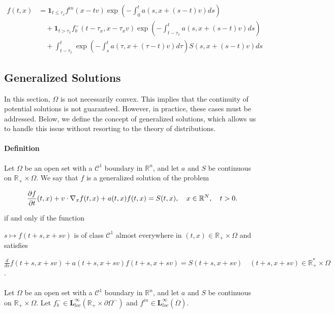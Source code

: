 \documentclass[a4paper, 11pt]{article}
\begin{document}
\[
\boxed{
	\begin{aligned}
		f(t,x) &= \mathbf{1}_{t \leq \tau_x} f^{in} (x-tv) \exp\left(-\int_0^t a(s,x+(s-t)v)ds\right) \\
		&\quad + \mathbf{1}_{t > \tau_x} f_b^- (t-\tau_x,x-\tau_x v) \exp\left(-\int_{t-\tau_x}^t a(s,x+(s-t)v)ds\right) \\
		&\quad + \int_{t-\tau_x}^t \exp\left(-\int_{s}^{t}a(\tau,x+(\tau-t)v)d\tau\right) S(s,x+(s-t)v)ds
\end{aligned}}
\]


\subsection{Generalized Solutions}

In this section, $\Omega$ is not necessarily convex. This implies that the continuity of potential solutions is not guaranteed. However, in practice, these cases must be addressed. Below, we define the concept of generalized solutions, which allows us to handle this issue without resorting to the theory of distributions.


\paragraph{Definition}

Let $\Omega$ be an open set with a $\mathcal{C}^1$ boundary in $\mathbb{R}^n$, and let $a$ and $S$ be continuous on $\mathbb{R}_+ \times \Omega$. We say that $f$ is a generalized solution of the problem

$$\frac{\partial f}{\partial t}(t,x)+v \cdot \nabla_x f(t,x)+ a(t,x)f(t,x)=S(t,x), \quad x \in \mathbb{R}^N, \quad t>0.\\$$

if and only if the function

$s \mapsto f(t+s,x+sv)$ is of class $\mathcal{C}^1$ almost everywhere in $(t,x) \in \mathbb{R}_+ \times \Omega$ and satisfies

$\frac{d}{ds}f(t+s,x+sv) +a(t+s,x+sv)f(t+s,x+sv) = S(t+s,x+sv) \quad (t+s,x+sv) \in \mathbb{R}_+^* \times \Omega$.


\paragraph{}



Let $\Omega$ be an open set with a $\mathcal{C}^1$ boundary in $\mathbb{R}^n$, and let $a$ and $S$ be continuous on $\mathbb{R}_+ \times \Omega$. Let $f_b^- \in \mathbf{L}_{loc}^{\infty}(\mathbb{R}_+ \times \partial \Omega^-)$ and $f^{in} \in \mathbf{L}_{loc}^{\infty}(\overline{\Omega})$.
\end{document}
